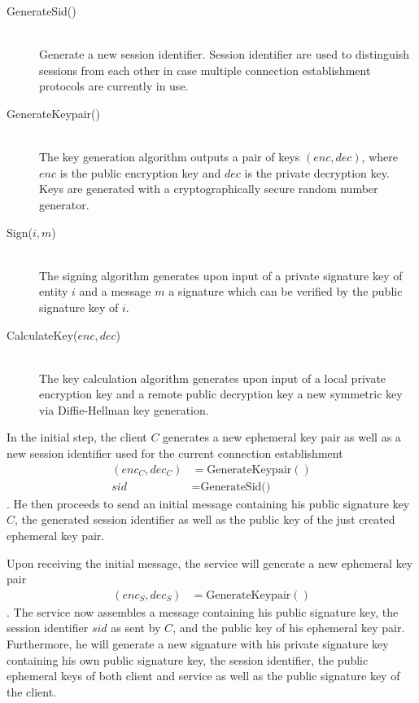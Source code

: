 \begin{description}
    \item[GenerateSid()]\hfill\\
        Generate a new session identifier.
        Session identifier are used to distinguish sessions from each other in case multiple connection establishment protocols are currently in use.
    \item[GenerateKeypair()]\hfill\\
        The key generation algorithm outputs a pair of keys $(enc, dec)$, where $enc$ is the public encryption key and $dec$ is the private decryption key.
        Keys are generated with a cryptographically secure random number generator.
    \item[Sign($i, m$)]\hfill\\
        The signing algorithm generates upon input of a private signature key of entity $i$ and a message $m$ a signature which can be verified by the public signature key of $i$.
    \item[CalculateKey($enc, dec$)]\hfill\\
        The key calculation algorithm generates upon input of a local private encryption key and a remote public decryption key a new symmetric key via Diffie-Hellman key generation.
\end{description}

In the initial step, the client $C$ generates a new ephemeral key pair as well as a new session identifier used for the current connection establishment
\begin{align*}
    (enc_C, dec_C) &= \text{GenerateKeypair}()\\
    sid &= \text{GenerateSid()}
\end{align*}.
He then proceeds to send an initial message containing his public signature key $C$, the generated session identifier as well as the public key of the just created ephemeral key pair.

Upon receiving the initial message, the service will generate a new ephemeral key pair
\begin{align*}
    (enc_S, dec_S) &= \text{GenerateKeypair}()
\end{align*}.
The service now assembles a message containing his public signature key, the session identifier $sid$ as sent by $C$, and the public key of his ephemeral key pair.
Furthermore, he will generate a new signature with his private signature key containing his own public signature key, the session identifier, the public ephemeral keys of both client and service as well as the public signature key of the client.

